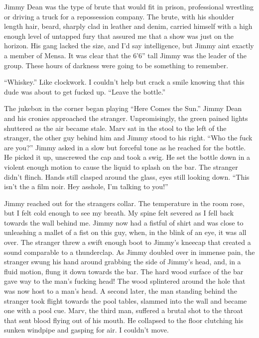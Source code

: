 Jimmy Dean was the type of brute that would fit in prison,
professional wrestling or driving a truck for a repossession
company. The brute, with his shoulder length hair, beard, sharply
clad in leather and denim, carried himself with a high enough level
of untapped fury that assured me that a show was just on the
horizon. His gang lacked the size, and I'd say intelligence,
but Jimmy aint exactly a member of Mensa. It was clear that the
6'6'' tall Jimmy was the leader of the group. These
hours of darkness were going to be something to remember.



``Whiskey.'' Like clockwork. I couldn't help but
crack a smile knowing that this dude was about to get fucked up.
``Leave the bottle.''



The jukebox in the corner began playing ``Here Comes the
Sun.'' Jimmy Dean and his cronies approached the stranger.
Unpromisingly, the green pained lights shuttered as the air became
stale. Marv sat in the stool to the left of the stranger, the other
guy behind him and Jimmy stood to his right. ``Who the fuck
are you?'' Jimmy asked in a slow but forceful tone as he
reached for the bottle. He picked it up, unscrewed the cap and took
a swig. He set the bottle down in a violent enough motion to cause
the liquid to splash on the bar. The stranger didn't flinch.
Hands still clasped around the glass, eyes still looking down.
``This isn't the a film noir. Hey asshole, I'm
talking to you!''



Jimmy reached out for the strangers collar. The temperature in the
room rose, but I felt cold enough to see my breath. My spine felt
severed as I fell back towards the wall behind me. Jimmy now had a
fistful of shirt and was close to unleashing a mallet of a fist on
this guy, when, in the blink of an eye, it was all over. The
stranger threw a swift enough boot to Jimmy's kneecap that
created a sound comparable to a thunderclap. As Jimmy doubled over
in immense pain, the stranger swung his hand around grabbing the
side of Jimmy's head, and, in a fluid motion, flung it down
towards the bar. The hard wood surface of the bar gave way to the
man's fucking head! The wood splintered around the hole that
was now host to a man's head. A second later, the man
standing behind the stranger took flight towards the pool tables,
slammed into the wall and became one with a pool cue. Marv, the
third man, suffered a brutal shot to the throat that sent blood
flying out of his mouth. He collapsed to the floor clutching his
sunken windpipe and gasping for air. I couldn't move.



